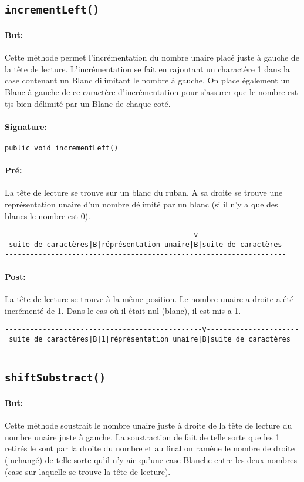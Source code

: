\documentclass[a4paper,11pt]{article}
\begin{document}
\subsection{\texttt{incrementLeft()}}
\paragraph{But:} Cette méthode permet l'incrémentation du nombre unaire placé juste à gauche de la tête de lecture. L'incrémentation se fait en rajoutant un charactère 1 dans la case contenant un Blanc dilimitant le nombre à gauche. On place également un Blanc à gauche de ce caractère d'incrémentation pour s'assurer que le nombre est tjs bien délimité par un Blanc de chaque coté.
\paragraph{Signature:} \texttt{public void incrementLeft()}
\paragraph{Pré:} 
La tête de lecture se trouve sur un blanc du ruban. A sa droite se trouve une représentation unaire d'un nombre délimité par un blanc (si il n'y a que des blancs le nombre est 0).
\begin{verbatim}
---------------------------------------------v---------------------
 suite de caractères|B|réprésentation unaire|B|suite de caractères
-------------------------------------------------------------------
\end{verbatim}
\paragraph{Post:}
La tête de lecture se trouve à la même position. Le nombre unaire a droite a été incrémenté de 1. Dans le cas où il était nul (blanc), il est mis a 1.
\begin{verbatim}
-----------------------------------------------v----------------------
 suite de caractères|B|1|réprésentation unaire|B|suite de caractères
----------------------------------------------------------------------
\end{verbatim}
\subsection{\texttt{shiftSubstract()}}
\paragraph{But:} Cette méthode soustrait le nombre unaire juste à droite de la tête de lecture du nombre unaire juste à gauche. La soustraction de fait de telle sorte que les 1 retirés le sont par la droite du nombre et au final on ramène le nombre de droite (inchangé) de telle sorte qu'il n'y aie qu'une case Blanche entre les deux nombres (case sur laquelle se trouve la tête de lecture).
\end{document}
